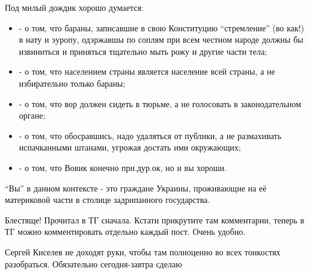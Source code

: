 \begin{itemize}

Под милый дождик хорошо думается:

\begin{itemize}
  \item - о том, что бараны, записавшие в свою Конституцию \enquote{стремление} (во как!) в нату и эуропу, одэржавшы по соплям при всем честном народе должны бы извиниться и приняться тщательно мыть рожу и другие части тела;
  \item - о том, что населением страны является население всей страны, а не избирательно только бараны;
  \item - о том, что вор должен сидеть в тюрьме, а не голосовать в законодательном органе;
  \item - о том, что обосравшись, надо удаляться от публики, а не размахивать испачканными штанами, угрожая достать ими окружающих;
  \item - о том, что Вовик конечно при.дур.ок, но и вы хороши.
\end{itemize}

\enquote{Вы} в данном контексте - это граждане Украины, проживающие на её материковой части в столице задрипанного государства.


Блестяще! Прочитал в ТГ сначала. Кстати прикрутите там комментарии, теперь в
ТГ можно комментировать отдельно каждый пост. Очень удобно.


Сергей Киселев не доходят руки, чтобы там полноценно во всех тонкостях разобраться. Обязательно сегодня-завтра сделаю

\end{itemize}
